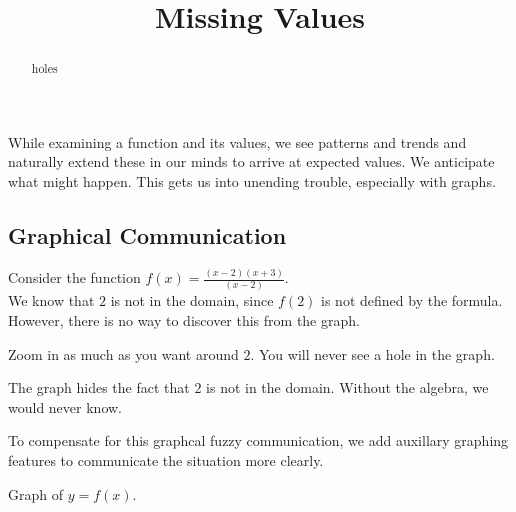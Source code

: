 \documentclass{ximera}
\title{Missing Values}
\begin{document}
\begin{abstract}
holes
\end{abstract}
\maketitle






While examining a function and its values, we see patterns and trends and naturally extend these in our minds to arrive at expected values. We anticipate what might happen.  This gets us into unending trouble, especially with graphs.



\subsection{Graphical Communication}


Consider the function $f(x) = \frac{(x-2)(x+3)}{(x-2)}$. \\

We know that $2$ is not in the domain, since $f(2)$ is not defined  by the formula.  However, there is no way to discover this from the graph.


Zoom in as much as you want around $2$. You will never see a hole in the graph.  

\begin{center}
\end{center}

The graph hides the fact that $2$ is not in the domain.  Without the algebra, we would never know.

To compensate for this graphcal fuzzy communication, we add auxillary graphing features to communicate the situation more clearly.



Graph of $y = f(x)$.

\begin{image}
\end{image}
\end{document}
